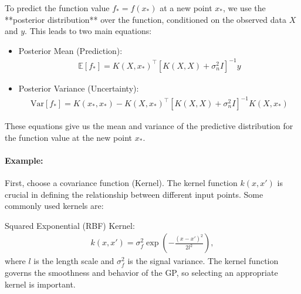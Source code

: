 To predict the function value \( f_* = f(x_*) \) at a new point \( x_* \), we use the **posterior distribution** over the function, conditioned on the observed data \( X \) and \( y \). This leads to two main equations:
\begin{itemize}
	\item Posterior Mean (Prediction):
		\begin{align*}
		  \mathbb{E}[f_*] = K(X, x_*)^\top [K(X, X) + \sigma_n^2 I]^{-1} y
		\end{align*}
	\item Posterior Variance (Uncertainty):
		\begin{align*}
			\text{Var}[f_*] = K(x_*, x_*) - K(X, x_*)^\top [K(X, X) + \sigma_n^2 I]^{-1} K(X, x_*)
		\end{align*}
\end{itemize}
These equations give us the mean and variance of the predictive distribution for the function value at the new point $x_*$.

\paragraph{Example:} First, choose a covariance function (\ie Kernel). The kernel function $k(x, x')$ is crucial in defining the relationship between different input points. Some commonly used kernels are:

Squared Exponential (RBF) Kernel:
\begin{align*}
	k(x, x') = \sigma_f^2 \exp\left(-\frac{(x - x')^2}{2l^2}\right),
\end{align*}
where $l$ is the length scale and $\sigma_f^2$ is the signal variance. The kernel function governs the smoothness and behavior of the GP, so selecting an appropriate kernel is important.

